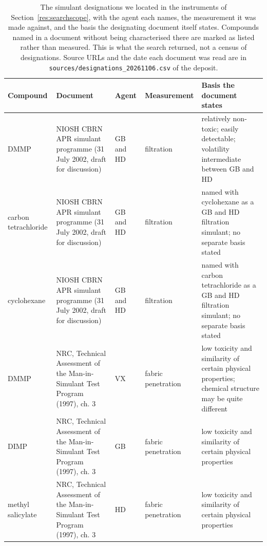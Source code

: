 \begin{table}[htb]
\centering
\caption{The simulant designations we located in the instruments of Section~\ref{res:searchscope}, with the agent each names, the measurement it was made against, and the basis the designating document itself states. Compounds named in a document without being characterised there are marked as listed rather than measured. This is what the search returned, not a census of designations. Source URLs and the date each document was read are in \texttt{sources/designations\_20261106.csv} of the deposit.}
\label{tab:designations}
\scriptsize
\setlength{\tabcolsep}{3pt}
\renewcommand{\arraystretch}{1.0}
\begin{tabular}{p{1.9cm}p{3.4cm}p{1.5cm}p{2.3cm}p{4.2cm}}
\hline
Compound & Document & Agent & Measurement & Basis the document states \\
\hline
DMMP & NIOSH CBRN APR simulant programme (31 July 2002, draft for discussion) & GB and HD & filtration & relatively non-toxic; easily detectable; volatility intermediate between GB and HD \\
carbon tetrachloride & NIOSH CBRN APR simulant programme (31 July 2002, draft for discussion) & GB and HD & filtration & named with cyclohexane as a GB and HD filtration simulant; no separate basis stated \\
cyclohexane & NIOSH CBRN APR simulant programme (31 July 2002, draft for discussion) & GB and HD & filtration & named with carbon tetrachloride as a GB and HD filtration simulant; no separate basis stated \\
DMMP & NRC, Technical Assessment of the Man-in-Simulant Test Program (1997), ch. 3 & VX & fabric penetration & low toxicity and similarity of certain physical properties; chemical structure may be quite different \\
DIMP & NRC, Technical Assessment of the Man-in-Simulant Test Program (1997), ch. 3 & GB & fabric penetration & low toxicity and similarity of certain physical properties \\
methyl salicylate & NRC, Technical Assessment of the Man-in-Simulant Test Program (1997), ch. 3 & HD & fabric penetration & low toxicity and similarity of certain physical properties \\

\end{tabular}
\end{table}
